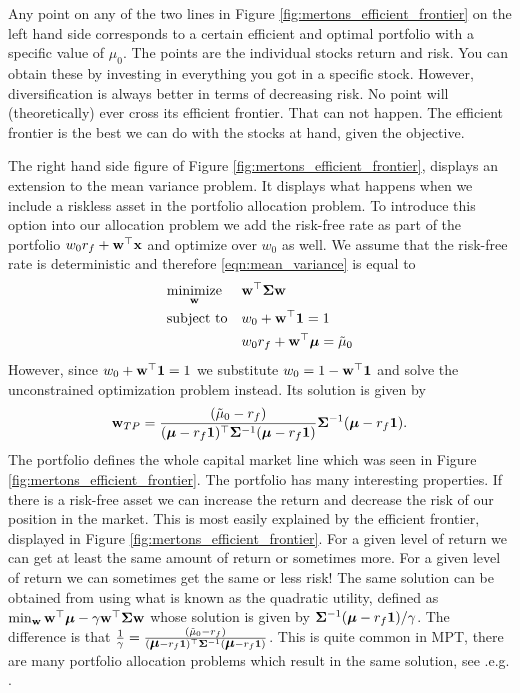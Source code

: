 \documentclass[oneside]{book}\usepackage{knitr}
\begin{document}
Any point on any of the two lines in Figure \ref{fig:mertons_efficient_frontier} on the left hand side corresponds to a certain efficient and optimal portfolio with a specific value of $\mu_0$. The points are the individual stocks return and risk. You can obtain these by investing in everything you got in a specific stock. However, diversification is always better in terms of decreasing risk. No point will (theoretically) ever cross its efficient frontier. That can not happen. The efficient frontier is the best we can do with the stocks at hand, given the objective.

The right hand side figure of Figure \ref{fig:mertons_efficient_frontier}, displays an extension to the mean variance problem. It displays what happens when we include a riskless asset in the portfolio allocation problem. To introduce this option into our allocation problem we add the risk-free rate as part of the portfolio $w_0 r_f + \mathbf{w}^\top \mathbf{x}$ and optimize over $w_0$ as well. We assume that the risk-free rate is deterministic and therefore \eqref{eqn:mean_variance} is equal to 
\begin{equation}\label{eqn:mean_variance_riskfree}
\begin{aligned}
& \underset{\mathbf{w}}{\text{minimize}} 
& & \mathbf{w}^\top \mathbf{\Sigma} \mathbf{w} \\
& \text{subject to}
& & w_0 + \mathbf{w}^\top \mathbf{1} = 1 \\
& && w_0 r_f + \mathbf{w}^\top \mbox{\boldmath$\mu$} = \tilde\mu_0 \\
\end{aligned}
\end{equation}
However, since $w_0 + \mathbf{w}^\top \mathbf{1}=1$ we substitute $w_0=1-\mathbf{w}^\top \mathbf{1}$ and solve the unconstrained optimization problem instead. Its solution is given by 
\begin{equation}\label{eqn:w_mean_variance_riskfree}
  \mathbf{w}_{TP} = \frac{(\tilde\mu_0-r_f)}{(\mbox{\boldmath$\mu$}-r_f \mathbf{1})^\top \mathbf{\Sigma}^{-1} (\mbox{\boldmath$\mu$}-r_f \mathbf{1})} \mathbf{\Sigma}^{-1} (\mbox{\boldmath$\mu$}-r_f \mathbf{1}).
\end{equation}
The portfolio defines the whole capital market line which was seen in Figure \ref{fig:mertons_efficient_frontier}. The portfolio has many interesting properties. If there is a risk-free asset we can increase the return and decrease the risk of our position in the market. This is most easily explained by the efficient frontier, displayed in Figure \ref{fig:mertons_efficient_frontier}. For a given level of return we can get at least the same amount of return or sometimes more. For a given level of return we can sometimes get the same or less risk! The same solution can be obtained from using what is known as the quadratic utility, defined as $\min_{\mathbf{w}} \mathbf{w}^\top \mbox{\boldmath$\mu$} - \gamma \mathbf{w}^\top \mathbf{\Sigma} \mathbf{w}$ whose solution is given by $\mathbf{\Sigma}^{-1} (\mbox{\boldmath$\mu$}-r_f \mathbf{1})/\gamma$. The difference is that $\frac{1}{\gamma} = \frac{(\tilde\mu_0-r_f)}{(\mbox{\boldmath$\mu$}-r_f \mathbf{1})^\top \mathbf{\Sigma}^{-1} (\mbox{\boldmath$\mu$}-r_f \mathbf{1})}$. This is quite common in MPT, there are many portfolio allocation problems which result in the same solution, see .e.g. \citet{bodnar2013equivalence}.
\end{document}
